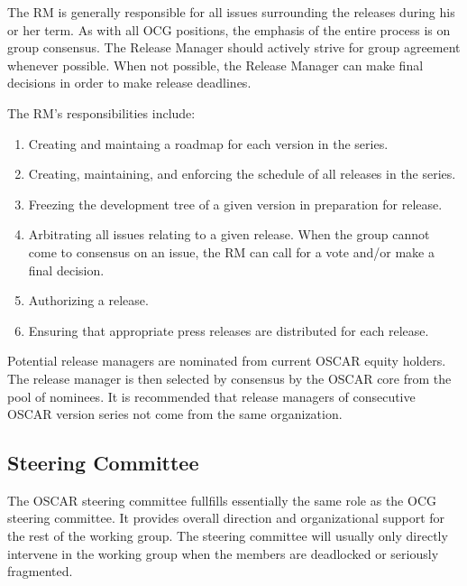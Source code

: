 The RM is generally responsible for all issues surrounding the
releases during his or her term.  As with all OCG positions, the
emphasis of the entire process is on group consensus.  The Release
Manager should actively strive for group agreement whenever possible.
When not possible, the Release Manager can make final decisions in
order to make release deadlines.

The RM's responsibilities include:

\begin{enumerate}
\item Creating and maintaing a roadmap for each version in the series.
  
\item Creating, maintaining, and enforcing the schedule of all
  releases in the series.

\item Freezing the development tree of a given version in preparation
  for release.

\item Arbitrating all issues relating to a given release.  When the
  group cannot come to consensus on an issue, the RM can call for a
  vote and/or make a final decision.

\item Authorizing a release.
  
\item Ensuring that appropriate press releases are distributed for
  each release.
\end{enumerate}

Potential release managers are nominated from current OSCAR equity
holders.  The release manager is then selected by consensus by the
OSCAR core from the pool of nominees.  It is recommended that release
managers of consecutive OSCAR version series not come from the same
organization. 


\subsection{Steering Committee}

The OSCAR steering committee fullfills essentially the same role as
the OCG steering committee.  It provides overall direction and
organizational support for the rest of the working group.  The
steering committee will usually only directly intervene in the working
group when the members are deadlocked or seriously fragmented. 

